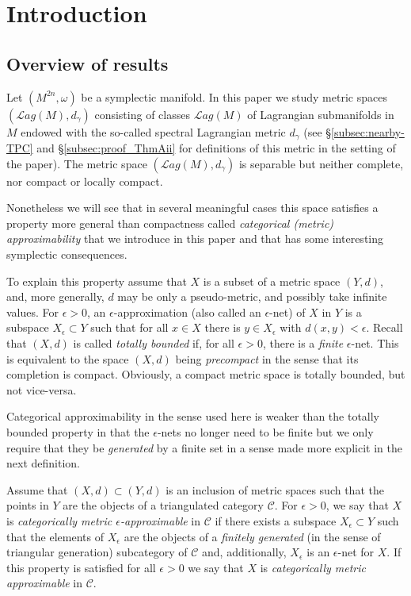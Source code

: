 


\section{Introduction} \label{sec-intro}

\subsection{Overview of results} \label{subsec:overview}
Let $(M^{2n},\omega)$ be a symplectic manifold. In this paper we study
metric spaces $(\mathcal{L}ag(M), d_{\gamma})$ consisting of classes $\mathcal{L}ag(M)$ of Lagrangian submanifolds in $M$ endowed with the so-called spectral Lagrangian metric $d_{\gamma}$ (see \S\ref{subsec:nearby-TPC} and \S\ref{subsec:proof_ThmAii} for definitions of this metric in the setting of the paper). The metric space $(\mathcal{L}ag(M), d_{\gamma})$ is separable \cite{Chasse:metrics2} 
but neither complete, nor compact or locally compact. 

Nonetheless we will see that in several meaningful cases this space satisfies a property more general than compactness called  {\em  categorical (metric)  approximability} that we introduce in this paper and that has some interesting symplectic consequences. 

To explain this property assume that $X$ is a subset of a metric space $(Y,d)$, and, more generally,  $d$ may be only a pseudo-metric, and possibly take infinite values.  For $\epsilon>0$, an $\epsilon$-approximation  (also called an $\epsilon$-net) of $X$ in $Y$ is a subspace $X_{\epsilon}\subset Y$ such that for all $x\in X$ there is $y\in X_{\epsilon}$ with $d(x,y)<\epsilon$. Recall that $(X,d)$ is called {\em totally bounded} if, for all $\epsilon > 0$, there is a {\em finite} $\epsilon$-net.  This is equivalent to the space $(X,d)$ being {\em precompact} in the sense that its completion is compact. Obviously, a compact metric space is totally bounded, but not vice-versa.

Categorical approximability in the sense used here is weaker than the totally bounded property in  that  the $\epsilon$-nets no longer need to be finite but we only require that they be {\em generated} by a finite set in a sense made more explicit in the next definition.  

\begin{dfn}\label{def:approx} Assume that $(X,d)\subset (Y,d)$ is an inclusion of metric spaces such that the points in $Y$ are the objects of a triangulated category $\mathcal{C}$. For $\epsilon > 0$, we say that 
$X$ is   {\em categorically metric $\epsilon$-approximable} in $\mathcal{C}$ if there exists a subspace $X_{\epsilon}\subset Y$ such that the elements of $X_{\epsilon}$ are the objects of a {\em finitely generated} (in the sense of triangular generation) subcategory of $\mathcal{C}$ and, additionally, $X_{\epsilon}$ is an $\epsilon$-net for $X$.  If this property is satisfied for all $\epsilon >0$ we say that $X$ is {\em categorically metric approximable} in $\mathcal{C}$. \end{dfn}

